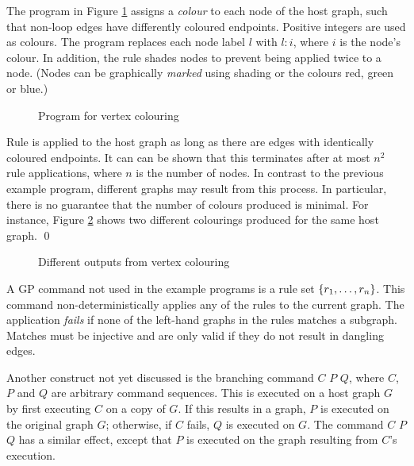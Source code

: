 \begin{example}
The program in Figure \ref{fig:vertex-colouring} assigns a \emph{colour}\/ to each node of the host graph, such that non-loop edges have differently coloured endpoints. Positive integers are used as colours. The program replaces each node label $l$\/ with $l{:}i$, where $i$\/ is the node's colour. In addition, the rule  shades nodes to prevent being applied twice to a node. (Nodes can be graphically \emph{marked}\/ using shading or the colours red, green or blue.)

\begin{figure}[htb]
\begin{center}
 
\end{center}
\caption{Program for vertex colouring}\label{fig:vertex-colouring}
\end{figure}

Rule  is applied to the host graph as long as there are edges with identically coloured endpoints. It can can be shown that this terminates after at most $n^2$ rule applications, where $n$\/ is the number of nodes. In contrast to the previous example program, different graphs may result from this process. In particular, there is no guarantee that the number of colours produced is minimal. For instance, Figure \ref{fig:colour_results} shows two different colourings produced for the same host graph.
\qed
\end{example}

\begin{figure}[htb]
\begin{center}
 
\end{center}
\caption{Different outputs from vertex colouring}\label{fig:colour_results}
\end{figure}

A GP command not used in the example programs is a rule set $\mathtt{\{}r_1,\dots,r_n\mathtt{\}}$. This command non-deterministically applies any of the rules to the current graph. The application \emph{fails}\/ if none of the left-hand graphs in the rules matches a subgraph. Matches must be injective and are only valid if they do not result in dangling edges.

Another construct not yet discussed is the branching command  $C$  $P$  $Q$, where $C$, $P$ and $Q$ are arbitrary command sequences. This is executed on a host graph $G$ by first executing $C$ on a copy of $G$. If this results in a graph, $P$\/ is executed on the original graph $G$; otherwise, if $C$ fails, $Q$ is executed on $G$. The command  $C$  $P$  $Q$ has a similar effect, except that $P$\/ is executed on the graph resulting from $C$'s execution. 
